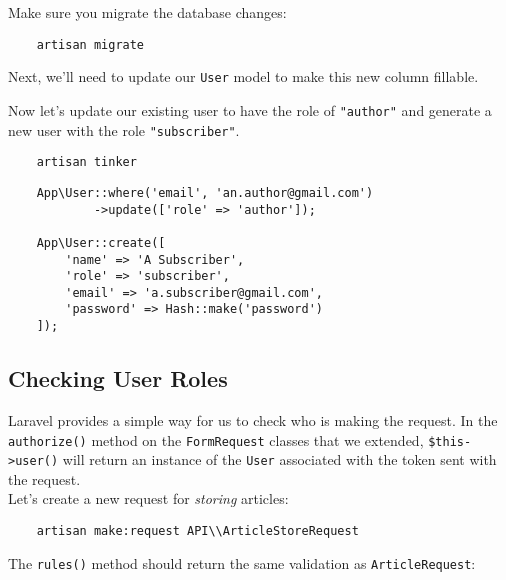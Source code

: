 Make sure you migrate the database changes:

\begin{verbatim}
    artisan migrate
\end{verbatim}

\pagebreak

Next, we'll need to update our \texttt{User} model to make this new column fillable.


Now let's update our existing user to have the role of \texttt{"author"} and generate a new user with the role \texttt{"subscriber"}.

\begin{verbatim}
    artisan tinker
\end{verbatim}

\begin{verbatim}
    App\User::where('email', 'an.author@gmail.com')
            ->update(['role' => 'author']);

    App\User::create([
        'name' => 'A Subscriber',
        'role' => 'subscriber',
        'email' => 'a.subscriber@gmail.com',
        'password' => Hash::make('password')
    ]);
\end{verbatim}


\subsection{Checking User Roles}

Laravel provides a simple way for us to check who is making the request. In the \texttt{authorize()} method on the \texttt{FormRequest} classes that we extended, \texttt{\$this->user()} will return an instance of the \texttt{User} associated with the token sent with the request.
\\

Let's create a new request for \textit{storing} articles:

\begin{verbatim}
    artisan make:request API\\ArticleStoreRequest
\end{verbatim}

\pagebreak

The \texttt{rules()} method should return the same validation as \texttt{ArticleRequest}:



